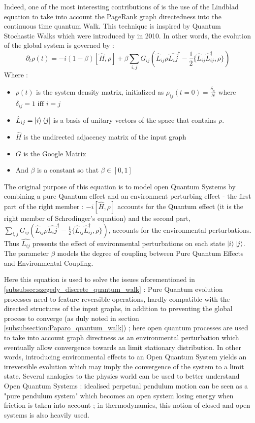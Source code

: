 \documentclass{article}
\begin{document}
Indeed, one of the most interesting contributions of \cite{sánchez-burillo_duch_gómez-gardeñes_zueco_2012} is the use of the Lindblad equation to take into account the PageRank graph directedness into the continuous time quantum Walk. This technique is inspired by Quantum Stochastic Walks which were introduced by \cite{whitfield_rodríguez-rosario_aspuru-guzik_2010} in 2010. In other words, the evolution of the global system is governed by :
\begin{equation}\label{lindblad_general_form}
\partial_t \rho(t) = -i (1- \beta) [\hat{H}, \rho] + \beta \sum_{i,j} G_{ij} (\hat{L}_{ij} \rho \hat{L_ij}^{\dagger} - \frac{1}{2}\{\hat{L}_{ij} \hat{L}_{ij}^\dagger, \rho\})
\end{equation}
Where :
\begin{itemize}
    \item $\rho(t)$ is the system density matrix, initialized as $\rho_{ij}(t=0) = \frac{\delta_{ij}}{N}$ where $\delta_{ij} = 1 \mbox{ iff } i=j$
    \item $\hat{L}_{ij} = \ket{i}\bra{j}$ is a basis of unitary vectors of the space that contains $\rho$.
    \item $\hat{H}$ is the undirected adjacency matrix of the input graph
    \item $G$ is the Google Matrix
    \item And $\beta$ is a constant so that $\beta \in [0,1]$
\end{itemize}

The original purpose of this equation is to model open Quantum Systems by combining a pure Quantum effect and an environment perturbing effect - the first part of the right member : $-i [\hat{H}, \rho]$ accounts for the Quantum effect (it is the right member of Schrodinger's equation) and the second part, $\sum_{i,j} G_{ij} (\hat{L}_{ij} \rho \hat{L_ij}^{\dagger} - \frac{1}{2}\{\hat{L}_{ij} \hat{L}_{ij}^\dagger, \rho\})$, accounts for the environmental perturbations. Thus $\hat{L_{ij}}$ presents the effect of environmental perturbations on each state $\ket{i}\ket{j}$. The parameter $\beta$ models the degree of coupling between Pure Quantum Effects and Environmental Coupling.

Here this equation is used to solve the issues aforementioned in \ref{subsubsec:szegedy_discrete_quantum_walk} : Pure Quantum evolution processes need to feature reversible operations, hardly compatible with the directed structures of the input graphs, in addition to preventing the global process to converge (as duly noted in section \ref{subsubsection:Paparo_quantum_walk}) ; here open quantum processes are used to take into account graph directness as an environmental perturbation which eventually allow convergence towards an limit stationary distribution. In other words, introducing environmental effects to an Open Quantum System yields an irreversible evolution which may imply the convergence of the system to a limit state. Several analogies to the physics world can be used to better understand Open Quantum Systems : idealised perpetual pendulum motion can be seen as a "pure pendulum system" which becomes an open system losing energy when friction is taken into account ; in thermodynamics, this notion of closed and open systems is also heavily used.
\end{document}
